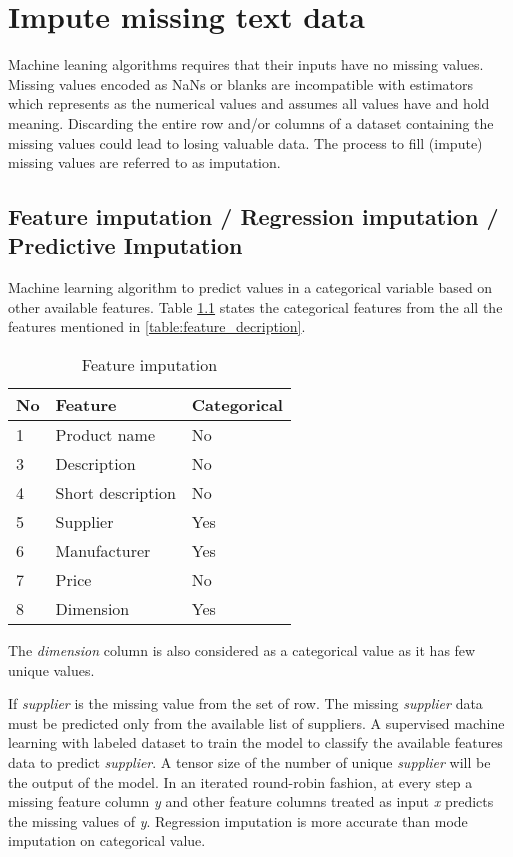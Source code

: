 \chapter{Impute missing text data}

Machine leaning algorithms requires that their inputs have no missing values.
Missing values encoded as NaNs or blanks are incompatible with estimators which represents as the numerical values and assumes all values have and hold meaning. Discarding the entire row and/or columns of a dataset containing the missing values could lead to losing valuable data. The process to fill (impute) missing values are referred to as imputation.

\section{Feature imputation / Regression imputation / Predictive Imputation}

Machine learning algorithm to predict values in a categorical variable based on other available features. Table \ref{table:feature_imputation} states the categorical features from the all the features mentioned in \ref{table:feature_decription}.


\begin{table}[h]
    \centering
    \caption{Feature imputation}
    \label{table:feature_imputation}
    \begin{tabular}{ lll }
          \toprule
          
          \textbf{No}& \textbf{Feature} & \textbf{Categorical}\\
          \midrule
          1&Product name & No\\
          3&Description & No\\         
          4&Short description  & No\\
          5&Supplier  & Yes\\
          6&Manufacturer  &  Yes\\           
          7&Price  &  No \\
          8&Dimension  & Yes\\
          \bottomrule
          \end{tabular}
\end{table}

The \textit{dimension} column is also considered as a categorical value as it has few unique values.

If \textit{supplier} is the missing value from the set of row. The missing \textit{supplier} data must be predicted only from the available list of suppliers. A supervised machine learning with labeled dataset to train the model to classify the available features data to predict \textit{supplier}. A tensor size of the number of unique \textit{supplier} will be the output of the model. 
In an iterated round-robin fashion, at every step a missing feature column  \textit{y} and other feature columns treated as input \textit{x} predicts the missing values of \textit{y}. Regression imputation is more accurate than mode imputation on categorical value.


